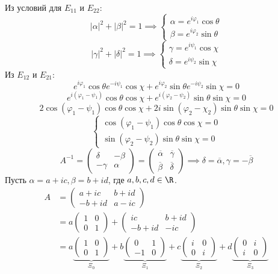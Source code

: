 Из условий для \(E_{11}\) и \(E_{22}\):
\[|\alpha|^2 + |\beta|^2 = 1 \implies \begin{cases}
		\alpha = e^{i \varphi_1} \cos\theta \\
		\beta = e^{i \varphi_2} \sin\theta
	\end{cases}\]
\[|\gamma|^2 + |\delta|^2 = 1 \implies \begin{cases}
		\gamma = e^{i \psi_1} \cos \chi \\
		\delta = e^{i \psi_2} \sin \chi
	\end{cases}\]
Из \(E_{12}\) и \(E_{21}\):
\[e^{i \varphi_1} \cos\theta e^{-i \psi_1} \cos \chi + e^{i \varphi_2} \sin\theta e^{-i\psi_2} \sin\chi = 0\]
\[e^{i (\varphi_1 - \psi_1)} \cos\theta \cos\chi + e^{i (\varphi_2 - \psi_2)} \sin\theta \sin\chi = 0\]
\[2 \cos(\varphi_1 - \psi_1) \cos\theta \cos\chi + 2i \sin(\varphi_2 - \chi_2) \sin\theta \sin\chi = 0\]
\[\begin{cases}
		\cos(\varphi_1 - \psi_1) \cos \theta \cos \chi = 0 \\
		\sin(\varphi_2 - \psi_2) \sin \theta \sin \chi = 0
	\end{cases}\]
\[A^{-1} = \begin{pmatrix} \delta & -\beta \\ -\gamma & \alpha \end{pmatrix}
	= \begin{pmatrix} \overline{\alpha} & \overline{\gamma} \\ \overline{\beta} & \overline{\delta} \end{pmatrix} \implies \delta = \overline{\alpha}, \gamma = -\overline{\beta}\]
Пусть \(\alpha = a + ic, \beta = b + id\), где  \(a, b, c, d \in \R\).
\begin{align*}
	A & = \begin{pmatrix} a + ic & b + id \\ -b + id & a - ic \end{pmatrix}                                           \\
	  & = a \begin{pmatrix} 1 & 0 \\ 0 & 1 \end{pmatrix} + \begin{pmatrix} ic & b + id \\ -b + id & -ic \end{pmatrix} \\
	  & = a  \underbrace{\begin{pmatrix} 1 & 0 \\ 0 & 1 \end{pmatrix}}_{\Xi_0}
	{}+ b \underbrace{\begin{pmatrix} 0 & 1 \\ -1 & 0 \end{pmatrix}}_{\Xi_1}
	{}+ c \underbrace{\begin{pmatrix} i & 0 \\ 0 & i \end{pmatrix}}_{\Xi_2}
	{}+ d \underbrace{\begin{pmatrix} 0 & i \\ i & 0 \end{pmatrix}}_{\Xi_3}
\end{align*}

